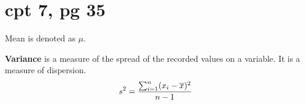 \documentclass[english, 12pt]{article}
\begin{document}

\section{cpt 7, pg 35}
\begin{note}
Mean is denoted as $\mu$.
\end{note}

\begin{defn}
\textbf{Variance} is a measure of the spread of the recorded values on a variable. It is a measure of dispersion.
\[ s^2 = \frac{\sum_{i=1}^n (x_{i}- \overline{x})^2}{n-1}\]
\end{defn}
\end{document}
